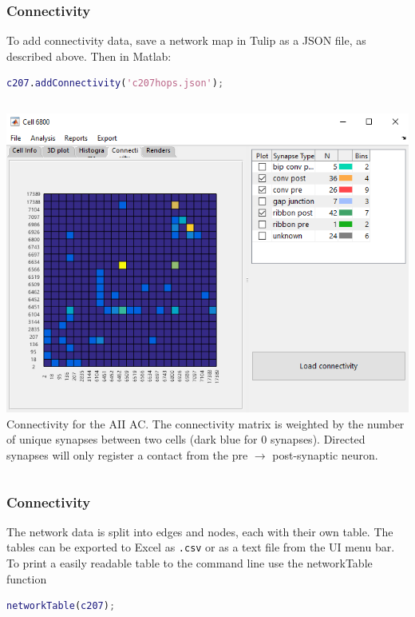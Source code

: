 \documentclass[11pt]{beamer}
\begin{document}
\begin{frame}[fragile]
	\frametitle{Connectivity}
	To add connectivity data, save a network map in Tulip as a JSON file, as described above. Then in Matlab:
	\begin{lstlisting}[language=matlab]
c207.addConnectivity('c207hops.json');\end{lstlisting}
	\vskip10pt
	\begin{columns}
		\includegraphics[height=0.4\textheight]{c6800_network}	
		\vskip10pt
		Connectivity for the AII AC.
		The connectivity matrix is weighted by the number of unique synapses between two cells (dark blue for 0 synapses). Directed synapses will only register a contact from the pre $\rightarrow$ post-synaptic neuron.
	\end{columns}
\end{frame}
\begin{frame}[fragile]
	\frametitle{Connectivity}
	The network data is split into edges and nodes, each with their own table. The tables can be exported to Excel as \texttt{.csv} or as a text file from the UI menu bar.\\
	\vskip10pt
	To print a easily readable table to the command line use the networkTable function
\begin{lstlisting}[language=matlab]
networkTable(c207);\end{lstlisting}
\end{frame}
\end{document}
